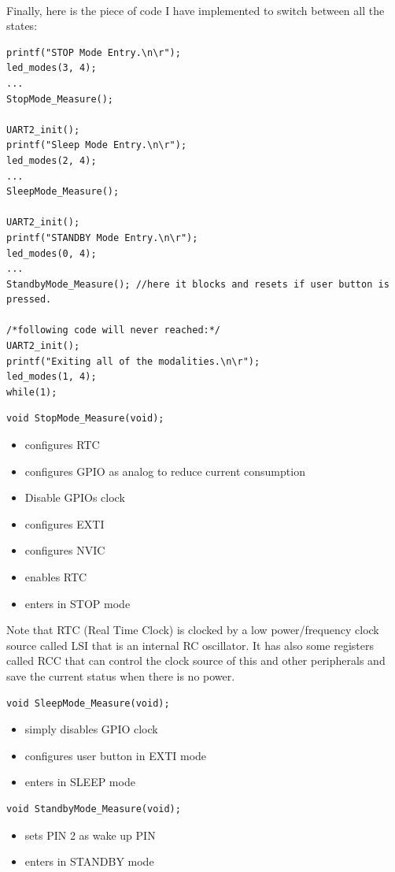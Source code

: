 \documentclass[peerreview]{IEEEtran}
\begin{document}
\\Finally, here is the piece of code I have implemented to switch between all the states:
\begin{lstlisting}[style=CStyle]
printf("STOP Mode Entry.\n\r");
led_modes(3, 4);
...
StopMode_Measure();
	
UART2_init();
printf("Sleep Mode Entry.\n\r");
led_modes(2, 4);
...
SleepMode_Measure();
	
UART2_init();
printf("STANDBY Mode Entry.\n\r");
led_modes(0, 4);
...
StandbyMode_Measure(); //here it blocks and resets if user button is pressed.

/*following code will never reached:*/
UART2_init();
printf("Exiting all of the modalities.\n\r");
led_modes(1, 4);
while(1);
\end{lstlisting}
\begin{lstlisting}[style=CStyle]
void StopMode_Measure(void);
\end{lstlisting}
\begin{itemize}
\item configures RTC
\item configures GPIO as analog to reduce current consumption
\item Disable GPIOs clock 
\item configures EXTI
\item configures NVIC
\item enables RTC
\item enters in STOP mode
\end{itemize}
Note that RTC (Real Time Clock) is clocked by a low power/frequency clock source called LSI that is an internal RC oscillator. It has also some registers called RCC that can control the clock source of this and other peripherals and save the current status when there is no power.
\begin{lstlisting}[style=CStyle]
void SleepMode_Measure(void);
\end{lstlisting}
\begin{itemize}
\item simply disables GPIO clock
\item configures user button in EXTI mode
\item enters in SLEEP mode
\end{itemize}
\begin{lstlisting}[style=CStyle]
void StandbyMode_Measure(void);
\end{lstlisting}
\begin{itemize}
\item sets PIN 2 as wake up PIN
\item enters in STANDBY mode
\end{itemize}
\end{document}
